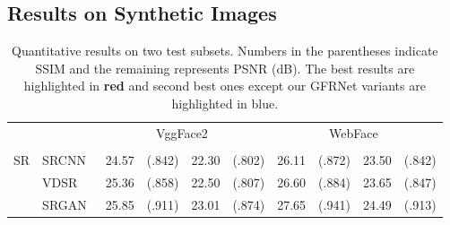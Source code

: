 \documentclass[runningheads]{llncs}
\begin{document}
\subsection{Results on Synthetic Images}
\begin{table*}[t]
	{\scriptsize \caption{Quantitative results on two test subsets. Numbers in the parentheses indicate SSIM and the remaining represents PSNR (dB). The best results are highlighted in {\bf \color{red}red} and second best ones except our GFRNet variants are highlighted in {\color{blue}blue}.
		}
		\begin{center}
			\label{table::Quantization}
\begin{tabular}{ c| l|c c c  c|c c c c}\hline
				\multicolumn{2}{c|}{\multirow{2}{*}{\makecell[c]{Methods}}} & \multicolumn{4}{c}{VggFace2~\cite{Vggface2}} &  \multicolumn{4}{|c}{WebFace~\cite{Webface}}\\
				\cline{3-10}
				\multicolumn{2}{c|}{}&\multicolumn{2}{c}{} &  \multicolumn{2}{c}{} &\multicolumn{2}{|c}{} &  \multicolumn{2}{c}{}\\
				\hline
				\multirow{4}{*}{SR}&SRCNN~\cite{dong2014learning}& 24.57 & (.842) & 22.30 & (.802)& 26.11 & (.872) & 23.50 & (.842) \\
				&VDSR~\cite{kim2016accurate}& 25.36 & (.858) & 22.50 & (.807)& 26.60 & (.884) &  23.65 & (.847)\\
				&SRGAN~\cite{Ledig2017CVPR}& 25.85 & (.911) & 23.01 & (.874)& 27.65 & (.941) &  24.49 & (.913)\\
				

\end{tabular}
\end{center}}
\end{table*}
\end{document}

